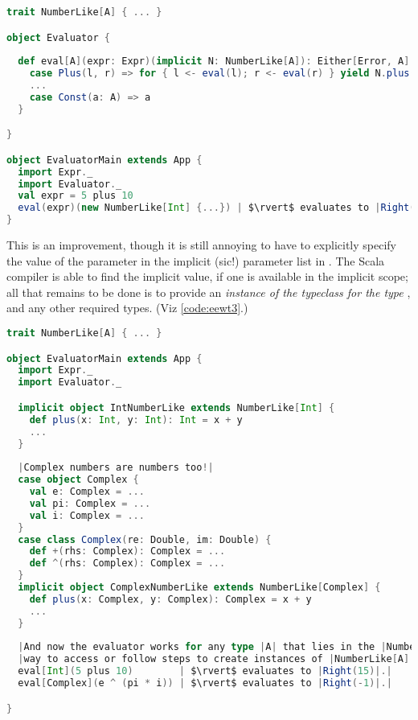 \documentclass[10 pt]{article}
\begin{document}
\begin{lstlisting}[caption={Expression evaluator with typeclasses-ish}, label={code:eewt2}, language=Scala, escapechar=|]
trait NumberLike[A] { ... }

object Evaluator {
 
  def eval[A](expr: Expr)(implicit N: NumberLike[A]): Either[Error, A] = expr match {
    case Plus(l, r) => for { l <- eval(l); r <- eval(r) } yield N.plus(l, r)
    ...
    case Const(a: A) => a
  }

}

object EvaluatorMain extends App {
  import Expr._
  import Evaluator._
  val expr = 5 plus 10
  eval(expr)(new NumberLike[Int] {...}) | $\rvert$ evaluates to |Right(15)|.|
}
\end{lstlisting}

This is an improvement, though it is still annoying to have to explicitly specify the value of the  parameter in the implicit (sic!) parameter list in . The Scala compiler is able to find the implicit value, if one is available in the implicit scope; all that remains to be done is to provide an \emph{instance of the  typeclass for the type }, and any other required types. (Viz \autoref{code:eewt3}.)

\begin{lstlisting}[caption={Expression evaluator with typeclasses}, label={code:eewt3}, language=Scala, escapechar=|]
trait NumberLike[A] { ... }

object EvaluatorMain extends App {
  import Expr._
  import Evaluator._

  implicit object IntNumberLike extends NumberLike[Int] {
    def plus(x: Int, y: Int): Int = x + y
    ...
  }
  
  |Complex numbers are numbers too!|
  case object Complex {
    val e: Complex = ...
    val pi: Complex = ...
    val i: Complex = ...
  }
  case class Complex(re: Double, im: Double) {
    def +(rhs: Complex): Complex = ...
    def ^(rhs: Complex): Complex = ...
  }
  implicit object ComplexNumberLike extends NumberLike[Complex] {
    def plus(x: Complex, y: Complex): Complex = x + y
    ...
  }
  
  |And now the evaluator works for any type |A| that lies in the |NumberLike| typeclass; i.e. where there is an in-scope|
  |way to access or follow steps to create instances of |NumberLike[A]|.|
  eval[Int](5 plus 10)        | $\rvert$ evaluates to |Right(15)|.|
  eval[Complex](e ^ (pi * i)) | $\rvert$ evaluates to |Right(-1)|.|

}
\end{lstlisting}
\end{document}
